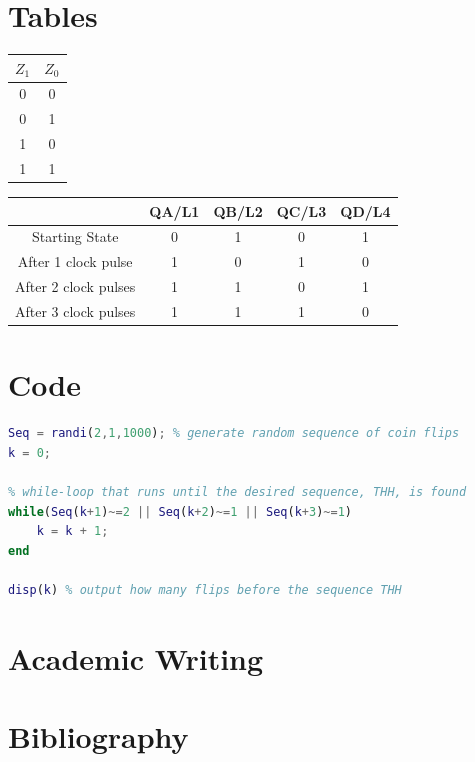 \documentclass[11pt, a4paper]{article}
\begin{document}
\section{Tables}

\begin{table}[!ht]
    \centering
    \small
    \begin{tabular}{|c|c|}
        \hline 
        $Z_1$ & $Z_0$ \\ \hline
        0 & 0 \\ \hline
        0 & 1 \\ \hline
        1 & 0 \\ \hline
        1 & 1 \\ \hline
    \end{tabular}
    \label{Step (2) Table}
\end{table}


\begin{table}[!ht]
    \small
    \begin{tabular}{|c|c|c|c|c|}
        \hline 
         & QA/L1 & QB/L2 & QC/L3 & QD/L4 \\ \hline
        Starting State & 0 & 1 & 0 & 1 \\ \hline
        After 1 clock pulse & 1 & 0 & 1 & 0 \\ \hline
        After 2 clock pulses & 1 & 1 & 0 & 1 \\ \hline
        After 3 clock pulses & 1 & 1 & 1 & 0 \\ \hline
    \end{tabular}
    \label{Step (14) Table}
\end{table}




\section{Code}

\begin{lstlisting}[language=MATLAB]
Seq = randi(2,1,1000); % generate random sequence of coin flips
k = 0;

% while-loop that runs until the desired sequence, THH, is found
while(Seq(k+1)~=2 || Seq(k+2)~=1 || Seq(k+3)~=1)
    k = k + 1;
end

disp(k) % output how many flips before the sequence THH
\end{lstlisting}




\section{Academic Writing} %





\section{Bibliography}
\end{document}

